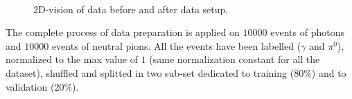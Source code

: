 \begin{figure}
	\centering
	 \quad
	 \\
	 \quad
	\caption{2D-vision of data before and after data setup.}
	\label{fig:2Dvision}
\end{figure}

The complete process of data preparation is applied on $10000$ events of photons and $10000$ events of neutral pions. All the events have been labelled ($\gamma$ and $\pi^0$), normalized to the max value of $1$ (same normalization constant for all the dataset), shuffled and splitted in two sub-set dedicated to training ($80\%$) and to validation ($20\%$).\\

